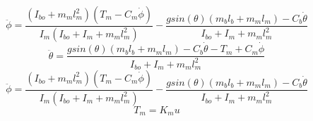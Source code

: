 \documentclass[12pt]{article}
\begin{document}
		\begin{equation}
			\ddot\phi = \frac{(I_{bo}+m_ml_m^2)(T_m-C_m\dot\phi)}{I_m(I_{bo}+I_m+m_ml_m^2)} - \frac{gsin(\theta)(m_bl_b+m_ml_m)-C_b\dot\theta}{I_{bo}+I_m+m_ml_m^2}
		\end{equation}
		\begin{equation}
			\boxed{\ddot\theta = \frac{gsin(\theta)(m_bl_b + m_ml_m) - C_b \dot\theta - T_m + C_m \dot\phi}{I_{bo}+I_m+m_ml_m^2}}
		\end{equation}
		\begin{equation}
			\boxed{\ddot\phi = \frac{(I_{bo}+m_ml_m^2)(T_m-C_m\dot\phi)}{I_m(I_{bo}+I_m+m_ml_m^2)} - \frac{gsin(\theta)(m_bl_b+m_ml_m)-C_b\dot\theta}{I_{bo}+I_m+m_ml_m^2}}
		\end{equation}
		\begin{equation}
			\boxed{T_m = K_m u}
		\end{equation}
	
\end{document}
